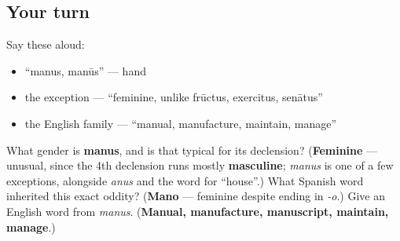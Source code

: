 \subsection*{Your turn}
Say these aloud:

\begin{itemize}
\raggedright
  \item \textquotedblleft{}manus, manūs\textquotedblright{} — hand
  \item the exception — \textquotedblleft{}feminine, unlike frūctus, exercitus, senātus\textquotedblright{}
  \item the English family — \textquotedblleft{}manual, manufacture, maintain, manage\textquotedblright{}
\end{itemize}

\begin{tcolorbox}[breakable,colback=teal!4,colframe=teal!35!black,title={Before you move on}]
What gender is \textbf{manus}, and is that typical for its declension? (\textbf{Feminine} — unusual, since the 4th declension runs mostly \textbf{masculine}; \emph{manus} is one of a few exceptions, alongside \emph{anus} and the word for \textquotedblleft{}house\textquotedblright{}.) What Spanish word inherited this exact oddity? (\textbf{Mano} — feminine despite ending in \emph{-o}.) Give an English word from \emph{manus}. (\textbf{Manual, manufacture, manuscript, maintain, manage}.)
\end{tcolorbox}
